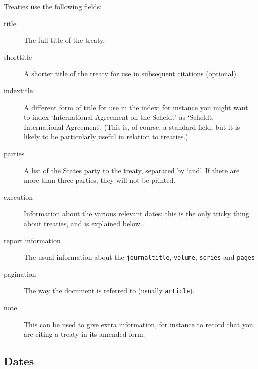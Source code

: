 \documentclass[a5paper,fontsize=9pt,DIV=1]{scrartcl}
\begin{document}
Treaties use the following fields:
\begin{description}
\item[title] 
The full title of the treaty.
\item[shorttitle] 
A shorter title of the treaty for use in subsequent
  citations (optional).
\item[indextitle]
  A different form of title for use in the index: for
  instance you might want to index `International Agreement on the
  Scheldt' as `Scheldt, International Agreement'. (This is, of course, a standard field, but it is likely to be particularly useful in relation to treaties.)
\item[parties]
  A list of the States party to the treaty, separated by
  `and'. If there are more than three parties, they will not be
  printed.
\item[execution]
  Information about the various relevant dates: this is
  the only tricky thing about treaties, and is explained below.
\item[\textrm{report information}] The usual information about the
  \texttt{journaltitle}, \texttt{volume}, \texttt{series} and
  \texttt{pages}
\item[pagination] The way the document is referred to (usually
  \texttt{article}).
\item[note]
  This can be used to give extra information, for instance
  to record that you are citing a treaty in its amended form.
\end{description}

\subsection{Dates}
\end{document}
